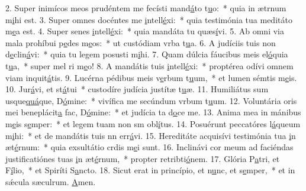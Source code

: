 2. Super inimícos meos prudéntem me fecísti mand\uline{á}to t\uline{u}o:~* quia in ætrnum m\uline{i}hi est.
3. Super omnes docéntes me \uline{i}ntell\uline{é}xi:~* quia testimónia tua meditáto m\uline{e}a est.
4. Super senes \uline{i}ntell\uline{é}xi:~* quia mandáta tu quæs\uline{í}vi.
5. Ab omni via mala prohíbui p\uline{e}des m\uline{e}os:~* ut custódiam vrba t\uline{u}a.
6. A judíciis tuis non d\uline{e}clin\uline{á}vi:~* quia tu legem posusti m\uline{i}hi.
7. Quam dúlcia fáucibus meis el\uline{ó}quia t\uline{u}a,~* super mel ri m\uline{e}o!
8. A mandátis tuis \uline{i}ntell\uline{é}xi:~* proptérea odívi omnem viam inquit\uline{á}tis.
9. Lucérna pédibus meis v\uline{e}rbum t\uline{u}um,~* et lumen sémtis m\uline{e}is.
10. Jur\uline{á}vi, et st\uline{á}tui~* custodíre judícia justítæ t\uline{u}æ.
11. Humiliátus sum usque\uline{quá}que, D\uline{ó}mine:~* vivífica me secúndum vrbum t\uline{u}um.
12. Voluntária oris mei beneplácit\uline{a} fac, D\uline{ó}mine:~* et judícia ta d\uline{o}ce me.
13. Anima mea in mánibus m\uline{e}is s\uline{e}mper:~* et legem tuam non sm obl\uline{í}tus.
14. Posuérunt peccatóres l\uline{á}queum m\uline{i}hi:~* et de mandátis tuis nn err\uline{á}vi.
15. Hereditáte acquisívi testimónia tua \uline{i}n æt\uline{é}rnum:~* quia exsultátio crdis m\uline{e}i sunt.
16. Inclinávi cor meum ad faciéndas justificatiónes tuas \uline{i}n æt\uline{é}rnum,~* propter retribti\uline{ó}nem.
17. Glória P\uline{a}tri, et F\uline{í}lio,~* et Spiríti S\uline{a}ncto.
18. Sicut erat in princípio, et n\uline{u}nc, et s\uline{e}mper,~* et in sǽcula sæculrum. \uline{A}men.
